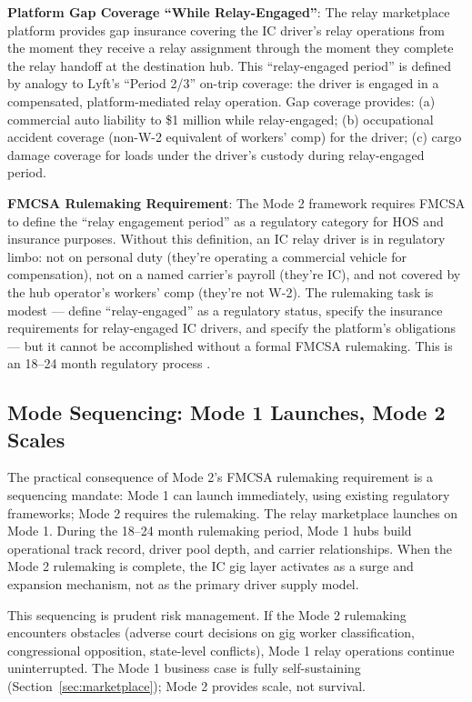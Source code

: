 \textbf{Platform Gap Coverage ``While Relay-Engaged''}: The relay marketplace platform provides gap insurance covering the IC driver's relay operations from the moment they receive a relay assignment through the moment they complete the relay handoff at the destination hub. This ``relay-engaged period'' is defined by analogy to Lyft's ``Period 2/3'' on-trip coverage: the driver is engaged in a compensated, platform-mediated relay operation. Gap coverage provides: (a) commercial auto liability to \$1 million while relay-engaged; (b) occupational accident coverage (non-W-2 equivalent of workers' comp) for the driver; (c) cargo damage coverage for loads under the driver's custody during relay-engaged period.

\textbf{FMCSA Rulemaking Requirement}: The Mode 2 framework requires FMCSA to define the ``relay engagement period'' as a regulatory category for HOS and insurance purposes. Without this definition, an IC relay driver is in regulatory limbo: not on personal duty (they're operating a commercial vehicle for compensation), not on a named carrier's payroll (they're IC), and not covered by the hub operator's workers' comp (they're not W-2). The rulemaking task is modest --- define ``relay-engaged'' as a regulatory status, specify the insurance requirements for relay-engaged IC drivers, and specify the platform's obligations --- but it cannot be accomplished without a formal FMCSA rulemaking. This is an 18--24 month regulatory process \citep{FMCSA_HOS2022}.

\subsection{Mode Sequencing: Mode 1 Launches, Mode 2 Scales}

The practical consequence of Mode 2's FMCSA rulemaking requirement is a sequencing mandate: Mode 1 can launch immediately, using existing regulatory frameworks; Mode 2 requires the rulemaking. The relay marketplace launches on Mode 1. During the 18--24 month rulemaking period, Mode 1 hubs build operational track record, driver pool depth, and carrier relationships. When the Mode 2 rulemaking is complete, the IC gig layer activates as a surge and expansion mechanism, not as the primary driver supply model.

This sequencing is prudent risk management. If the Mode 2 rulemaking encounters obstacles (adverse court decisions on gig worker classification, congressional opposition, state-level conflicts), Mode 1 relay operations continue uninterrupted. The Mode 1 business case is fully self-sustaining (Section~\ref{sec:marketplace}); Mode 2 provides scale, not survival.

